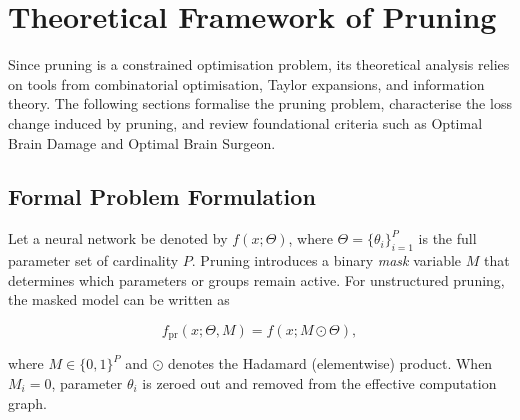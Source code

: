 \section{Theoretical Framework of Pruning}

Since pruning is a constrained optimisation problem, its theoretical analysis relies on tools from combinatorial optimisation, Taylor expansions, and information theory.  The following sections formalise the pruning problem, characterise the loss change induced by pruning, and review foundational criteria such as Optimal Brain Damage and Optimal Brain Surgeon.
\subsection{Formal Problem Formulation}

Let a neural network be denoted by $f(x;\Theta)$, where
$\Theta = \{\theta_i\}_{i=1}^{P}$ is the full parameter set of cardinality
$P$.  Pruning introduces a binary \emph{mask} variable $M$ that determines
which parameters or groups remain active.  For unstructured pruning, the
masked model can be written as

\begin{equation}
	f_{\mathrm{pr}}(x;\Theta,M) = f(x; M \odot \Theta),
	\label{eq:masked_model}
\end{equation}

where $M \in \{0,1\}^{P}$ and $\odot$ denotes the Hadamard (elementwise)
product.  When $M_i = 0$, parameter $\theta_i$ is zeroed out and removed
from the effective computation graph.
%

